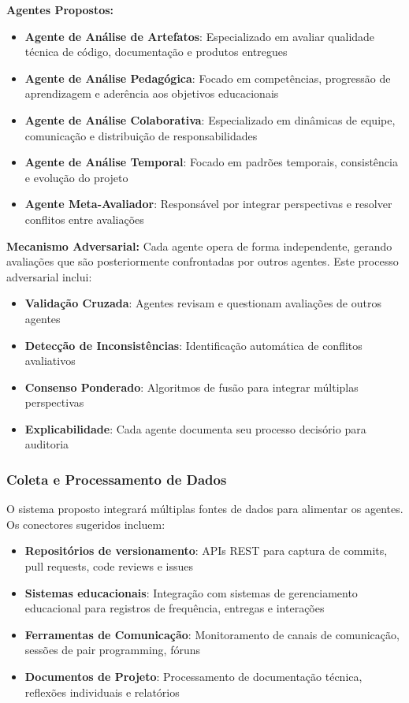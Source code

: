 \documentclass[english, spanish, brazilian]{modelo_dt}
\begin{document}
\textbf{Agentes Propostos:}

\begin{itemize}
\item \textbf{Agente de Análise de Artefatos}: Especializado em avaliar qualidade técnica de código, documentação e produtos entregues
\item \textbf{Agente de Análise Pedagógica}: Focado em competências, progressão de aprendizagem e aderência aos objetivos educacionais
\item \textbf{Agente de Análise Colaborativa}: Especializado em dinâmicas de equipe, comunicação e distribuição de responsabilidades
\item \textbf{Agente de Análise Temporal}: Focado em padrões temporais, consistência e evolução do projeto
\item \textbf{Agente Meta-Avaliador}: Responsável por integrar perspectivas e resolver conflitos entre avaliações
\end{itemize}

\textbf{Mecanismo Adversarial:}
Cada agente opera de forma independente, gerando avaliações que são posteriormente confrontadas por outros agentes. Este processo adversarial inclui:

\begin{itemize}
\item \textbf{Validação Cruzada}: Agentes revisam e questionam avaliações de outros agentes
\item \textbf{Detecção de Inconsistências}: Identificação automática de conflitos avaliativos
\item \textbf{Consenso Ponderado}: Algoritmos de fusão para integrar múltiplas perspectivas
\item \textbf{Explicabilidade}: Cada agente documenta seu processo decisório para auditoria
\end{itemize}

\subsubsection{Coleta e Processamento de Dados}

O sistema proposto integrará múltiplas fontes de dados para alimentar os agentes. Os conectores sugeridos incluem:

\begin{itemize}
\item \textbf{Repositórios de versionamento}: APIs REST para captura de commits, pull requests, code reviews e issues
\item \textbf{Sistemas educacionais}: Integração com sistemas de gerenciamento educacional para registros de frequência, entregas e interações
\item \textbf{Ferramentas de Comunicação}: Monitoramento de canais de comunicação, sessões de pair programming, fóruns
\item \textbf{Documentos de Projeto}: Processamento de documentação técnica, reflexões individuais e relatórios
\end{itemize}
\end{document}
